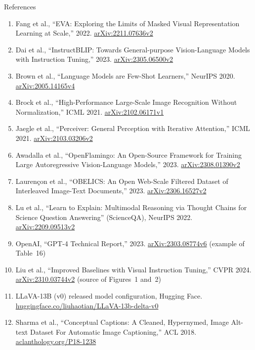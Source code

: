 \begin{frame}[allowframebreaks]{References}
\begin{enumerate}
    \item Fang et al., ``EVA: Exploring the Limits of Masked Visual Representation Learning at Scale,'' 2022. \href{https://arxiv.org/abs/2211.07636v2}{arXiv:2211.07636v2}
    \item Dai et al., ``InstructBLIP: Towards General-purpose Vision-Language Models with Instruction Tuning,'' 2023. \href{https://arxiv.org/abs/2305.06500v2}{arXiv:2305.06500v2}
    \item Brown et al., ``Language Models are Few-Shot Learners,'' NeurIPS 2020. \href{https://arxiv.org/abs/2005.14165v4}{arXiv:2005.14165v4}
    \item Brock et al., ``High-Performance Large-Scale Image Recognition Without Normalization,'' ICML 2021. \href{https://arxiv.org/abs/2102.06171v1}{arXiv:2102.06171v1}
    \item Jaegle et al., ``Perceiver: General Perception with Iterative Attention,'' ICML 2021. \href{https://arxiv.org/abs/2103.03206v2}{arXiv:2103.03206v2}
    \item Awadalla et al., ``OpenFlamingo: An Open-Source Framework for Training Large Autoregressive Vision-Language Models,'' 2023. \href{https://arxiv.org/abs/2308.01390v2}{arXiv:2308.01390v2}
    \item Lauren\c{c}on et al., ``OBELICS: An Open Web-Scale Filtered Dataset of Interleaved Image-Text Documents,'' 2023. \href{https://arxiv.org/abs/2306.16527v2}{arXiv:2306.16527v2}
    \item Lu et al., ``Learn to Explain: Multimodal Reasoning via Thought Chains for Science Question Answering'' (ScienceQA), NeurIPS 2022. \href{https://arxiv.org/abs/2209.09513v2}{arXiv:2209.09513v2}
    \item OpenAI, ``GPT-4 Technical Report,'' 2023. \href{https://arxiv.org/abs/2303.08774v6}{arXiv:2303.08774v6} (example of Table~16)
    \item Liu et al., ``Improved Baselines with Visual Instruction Tuning,'' CVPR 2024. \href{https://arxiv.org/abs/2310.03744v2}{arXiv:2310.03744v2} (source of Figures~1 and~2)
    \item LLaVA-13B (v0) released model configuration, Hugging Face. \href{https://huggingface.co/liuhaotian/LLaVA-13b-delta-v0/blob/main/config.json}{huggingface.co/liuhaotian/LLaVA-13b-delta-v0}
    \item Sharma et al., ``Conceptual Captions: A Cleaned, Hypernymed, Image Alt-text Dataset For Automatic Image Captioning,'' ACL 2018. \href{https://aclanthology.org/P18-1238/}{aclanthology.org/P18-1238}

\end{enumerate}
\end{frame}

